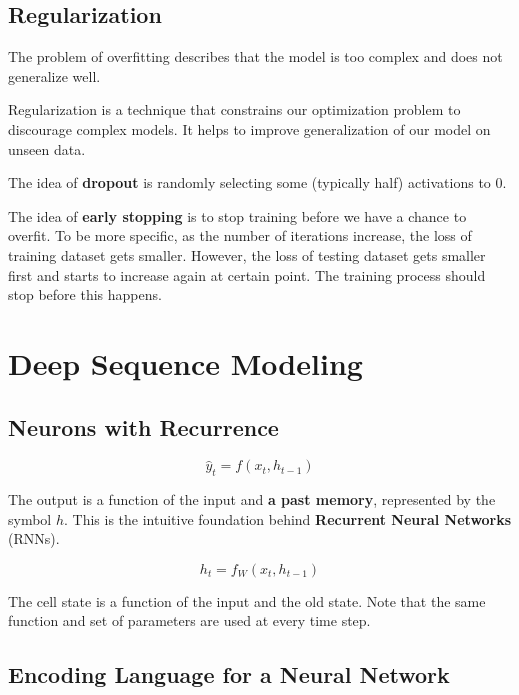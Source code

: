\documentclass[12pt, a4paper, oneside]{article}
\begin{document}
\subsection{Regularization}

The problem of overfitting describes that the model is too complex and does not generalize well.

Regularization is a technique that constrains our optimization problem to discourage complex models. It helps to improve generalization of our model on unseen data.

The idea of \textbf{dropout} is randomly selecting some (typically half) activations to $0$.

The idea of \textbf{early stopping} is to stop training before we have a chance to overfit. To be more specific, as the number of iterations increase, the loss of training dataset gets smaller. However, the loss of testing dataset gets smaller first and starts to increase again at certain point. The training process should stop before this happens.

\section{Deep Sequence Modeling}

\subsection{Neurons with Recurrence}

\begin{equation*}
    \hat{y}_{t}=f(x_{t},h_{t-1})
\end{equation*}

The output is a function of the input and \textbf{a past memory}, represented by the symbol $h$. This is the intuitive foundation behind \textbf{Recurrent Neural Networks} (RNNs).

\begin{equation*}
    h_{t}=f_{W}(x_{t},h_{t-1})
\end{equation*}

The cell state is a function of the input and the old state. Note that the same function and set of parameters are used at every time step.

\subsection{Encoding Language for a Neural Network}
\end{document}
